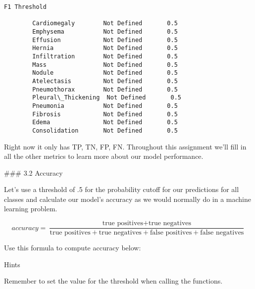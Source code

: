 \documentclass[11pt]{article}
\begin{document}
\begin{Verbatim}[commandchars=\\\{\}]
                                     F1 Threshold  
                                                   
        Cardiomegaly        Not Defined       0.5  
        Emphysema           Not Defined       0.5  
        Effusion            Not Defined       0.5  
        Hernia              Not Defined       0.5  
        Infiltration        Not Defined       0.5  
        Mass                Not Defined       0.5  
        Nodule              Not Defined       0.5  
        Atelectasis         Not Defined       0.5  
        Pneumothorax        Not Defined       0.5  
        Pleural\_Thickening  Not Defined       0.5  
        Pneumonia           Not Defined       0.5  
        Fibrosis            Not Defined       0.5  
        Edema               Not Defined       0.5  
        Consolidation       Not Defined       0.5  
\end{Verbatim}
            
    Right now it only has TP, TN, FP, FN. Throughout this assignment we'll
fill in all the other metrics to learn more about our model performance.

     \#\#\# 3.2 Accuracy

    Let's use a threshold of .5 for the probability cutoff for our
predictions for all classes and calculate our model's accuracy as we
would normally do in a machine learning problem.

\[accuracy = \frac{\text{true positives} + \text{true negatives}}{\text{true positives} + \text{true negatives} + \text{false positives} + \text{false negatives}}\]

Use this formula to compute accuracy below:

     Hints

Remember to set the value for the threshold when calling the functions.
\end{document}
